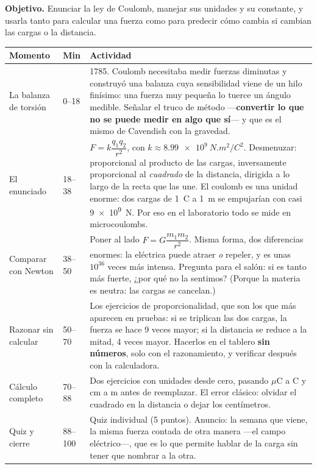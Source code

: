 \documentclass[11pt]{article}
\begin{document}

\textbf{Objetivo.} Enunciar la ley de Coulomb, manejar sus unidades y su constante, y usarla
tanto para calcular una fuerza como para predecir cómo cambia si cambian las cargas o la
distancia.

\begin{center}
{\renewcommand{\arraystretch}{1.3}
\begin{tabularx}{\linewidth}{@{}l l X@{}}
  \toprule
  \textbf{Momento} & \textbf{Min} & \textbf{Actividad}\\
  \midrule
  La balanza de torsión & 0--18 & 1785. Coulomb necesitaba medir fuerzas diminutas y construyó
    una balanza cuya sensibilidad viene de un hilo finísimo: una fuerza muy pequeña lo tuerce
    un ángulo medible. Señalar el truco de método —\textbf{convertir lo que no se puede medir
    en algo que sí}— y que es el mismo de Cavendish con la gravedad.\\
  El enunciado & 18--38 & $F = k\dfrac{q_1 q_2}{r^2}$, con $k \approx
    \qty{8,99e9}{N.m^2/C^2}$. Desmenuzar: proporcional al producto de las cargas, inversamente
    proporcional al \emph{cuadrado} de la distancia, dirigida a lo largo de la recta que las
    une. El coulomb es una unidad enorme: dos cargas de \qty{1}{C} a \qty{1}{m} se empujarían
    con casi \qty{9e9}{N}. Por eso en el laboratorio todo se mide en microcoulombs.\\
  Comparar con Newton & 38--50 & Poner al lado $F = G\dfrac{m_1 m_2}{r^2}$. Misma forma, dos
    diferencias enormes: la eléctrica puede atraer \emph{o} repeler, y es unas $10^{36}$ veces
    más intensa. Pregunta para el salón: si es tanto más fuerte, ¿por qué no la sentimos?
    (Porque la materia es neutra: las cargas se cancelan.)\\
  Razonar sin calcular & 50--70 & Los ejercicios de proporcionalidad, que son los que más
    aparecen en pruebas: si se triplican las dos cargas, la fuerza se hace 9 veces mayor; si
    la distancia se reduce a la mitad, 4 veces mayor. Hacerlos en el tablero \textbf{sin
    números}, solo con el razonamiento, y verificar después con la calculadora.\\
  Cálculo completo & 70--88 & Dos ejercicios con unidades desde cero, pasando
    $\mu$C a C y cm a m antes de reemplazar. El error clásico: olvidar el cuadrado en la
    distancia o dejar los centímetros.\\
  Quiz y cierre & 88--100 & Quiz individual (5 puntos). Anuncio: la semana que viene, la misma
    fuerza contada de otra manera —el campo eléctrico—, que es lo que permite hablar de la
    carga sin tener que nombrar a la otra.\\
  \bottomrule
\end{tabularx}}
\end{center}
\end{document}
